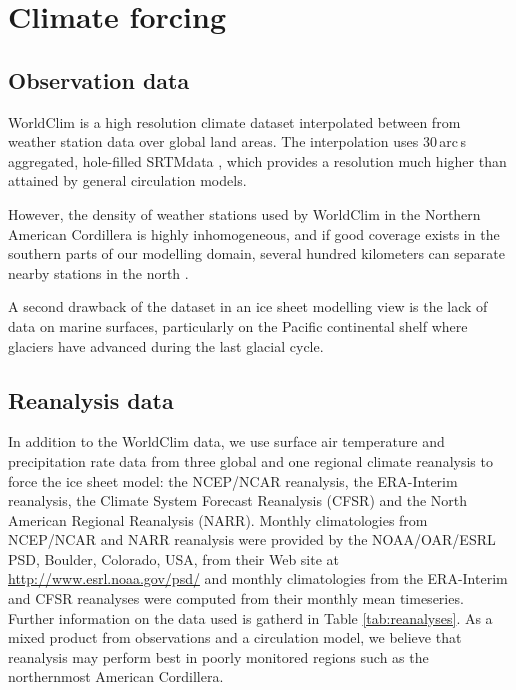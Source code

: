 
\section{Climate forcing}
\label{sec:climate}

\subsection{Observation data}

WorldClim \citep{data:worldclim} is a high resolution climate dataset interpolated between from weather station data over global land areas. The interpolation uses 30\,arc\,s aggregated, hole-filled SRTM\needref data , which provides a resolution much higher than attained by general circulation models.

However, the density of weather stations used by WorldClim in the Northern American Cordillera is highly inhomogeneous, and if good coverage exists in the southern parts of our modelling domain, several hundred kilometers can separate nearby stations in the north \citep{data:worldclim}.

A second drawback of the dataset in an ice sheet modelling view is the lack of data on marine surfaces, particularly on the Pacific continental shelf where glaciers have advanced during the last glacial cycle\needref.


\subsection{Reanalysis data}

In addition to the WorldClim data, we use surface air temperature and precipitation rate data from three global and one regional climate reanalysis to force the ice sheet model: the NCEP/NCAR reanalysis, the ERA-Interim reanalysis, the Climate System Forecast Reanalysis (CFSR) and the North American Regional Reanalysis (NARR). Monthly climatologies from NCEP/NCAR and NARR reanalysis were provided by the NOAA/OAR/ESRL PSD, Boulder, Colorado, USA, from their Web site at \url{http://www.esrl.noaa.gov/psd/} and monthly climatologies from the ERA-Interim and CFSR reanalyses were computed from their monthly mean timeseries. Further information on the data used is gatherd in Table \ref{tab:reanalyses}. As a mixed product from observations and a circulation model, we believe that reanalysis may perform best in poorly monitored regions such as the northernmost American Cordillera.

